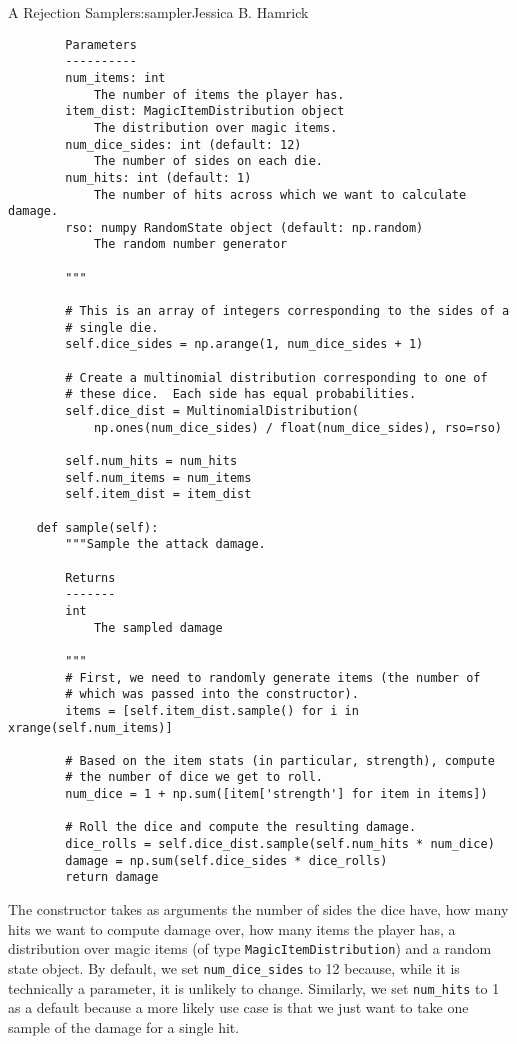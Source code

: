 \begin{aosachapter}{A Rejection Sampler}{s:sampler}{Jessica B. Hamrick}
\begin{verbatim}
        Parameters
        ----------
        num_items: int
            The number of items the player has.
        item_dist: MagicItemDistribution object
            The distribution over magic items.
        num_dice_sides: int (default: 12)
            The number of sides on each die.
        num_hits: int (default: 1)
            The number of hits across which we want to calculate damage.
        rso: numpy RandomState object (default: np.random)
            The random number generator

        """

        # This is an array of integers corresponding to the sides of a
        # single die.
        self.dice_sides = np.arange(1, num_dice_sides + 1)

        # Create a multinomial distribution corresponding to one of
        # these dice.  Each side has equal probabilities.
        self.dice_dist = MultinomialDistribution(
            np.ones(num_dice_sides) / float(num_dice_sides), rso=rso)

        self.num_hits = num_hits
        self.num_items = num_items
        self.item_dist = item_dist

    def sample(self):
        """Sample the attack damage.

        Returns
        -------
        int
            The sampled damage

        """
        # First, we need to randomly generate items (the number of
        # which was passed into the constructor).
        items = [self.item_dist.sample() for i in xrange(self.num_items)]

        # Based on the item stats (in particular, strength), compute
        # the number of dice we get to roll.
        num_dice = 1 + np.sum([item['strength'] for item in items])

        # Roll the dice and compute the resulting damage.
        dice_rolls = self.dice_dist.sample(self.num_hits * num_dice)
        damage = np.sum(self.dice_sides * dice_rolls)
        return damage
\end{verbatim}

The constructor takes as arguments the number of sides the dice have,
how many hits we want to compute damage over, how many items the player
has, a distribution over magic items (of type
\texttt{MagicItemDistribution}) and a random state object. By default,
we set \texttt{num\_dice\_sides} to 12 because, while it is technically
a parameter, it is unlikely to change. Similarly, we set
\texttt{num\_hits} to 1 as a default because a more likely use case is
that we just want to take one sample of the damage for a single hit.


\end{aosachapter}
